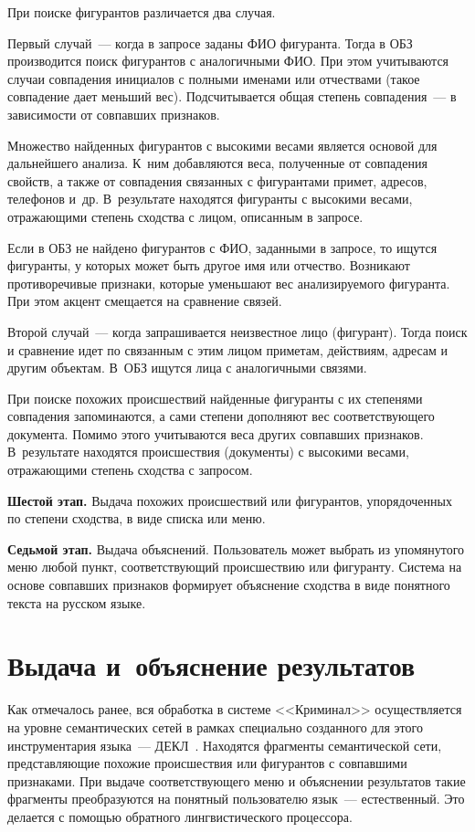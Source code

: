 \begin{multicols}{2}
    При поиске фигурантов различается два случая. 
    
    Первый случай~--- когда в 
запросе заданы ФИО фигуранта. Тогда в ОБЗ производится поиск фигурантов с 
аналогичными ФИО. При этом учитываются случаи совпадения инициалов с 
полными именами или отчествами (такое совпадение дает меньший вес). 
Подсчитывается общая степень совпадения~--- в зависимости от совпавших 
признаков.
    
    Множество найденных фигурантов с высокими весами является основой 
для дальнейшего анализа. К~ним добавляются веса, полученные от совпадения 
свойств, а также от совпадения связанных с фигурантами примет, адресов, 
телефонов и~др. В~результате находятся фигуранты с высокими весами, 
отражающими степень сходства с лицом, описанным в запросе.
    
    Если в ОБЗ не найдено фигурантов с ФИО, заданными в запросе, то 
ищутся фигуранты, у которых может быть другое имя или отчество. Возникают 
противоречивые признаки, которые уменьшают вес анализируемого фигуранта. 
При этом акцент смещается на сравнение связей.
    
    Второй случай~--- когда запрашивается неизвестное лицо (фигурант). 
Тогда поиск и сравнение идет по связанным с этим лицом приметам, 
действиям, адресам и другим объектам. В~ОБЗ ищутся лица с аналогичными 
связями.
    
    При поиске похожих происшествий найденные фигуранты с их степенями 
совпадения запоминаются, а сами степени дополняют вес соответ\-ст\-ву\-юще\-го 
документа. Помимо этого учитываются веса других совпавших признаков. 
В~результате находятся происшествия (документы) с высокими весами, 
отражающими степень сходства с запросом.
    
    \textbf{Шестой этап.} Выдача похожих происшествий или фигурантов, 
упорядоченных по степени сходства, в виде списка или меню.
    
    \textbf{Седьмой этап.} Выдача объяснений. Пользователь может выбрать 
из упомянутого меню любой пункт, соответствующий происшествию или 
фигуранту. Система на основе совпавших признаков формирует объяснение 
сходства в виде понятного текста на русском языке.
    
\section{Выдача и~объяснение результатов}
    
    Как отмечалось ранее, вся обработка в системе <<Криминал>> 
осуществляется на уровне семантических сетей в рамках специально 
созданного для этого инструментария языка~--- ДЕКЛ~\cite{2sha, 8sha}. Находятся 
фрагменты семантической сети, представляющие похожие происшествия или 
фигурантов с совпавшими признаками. При выдаче соответствующего меню и 
объяснении результатов такие фрагменты преобразуются на понятный 
пользователю язык~--- естественный. Это делается с помощью обратного 
лингвистического процессора.
    

\end{multicols}
